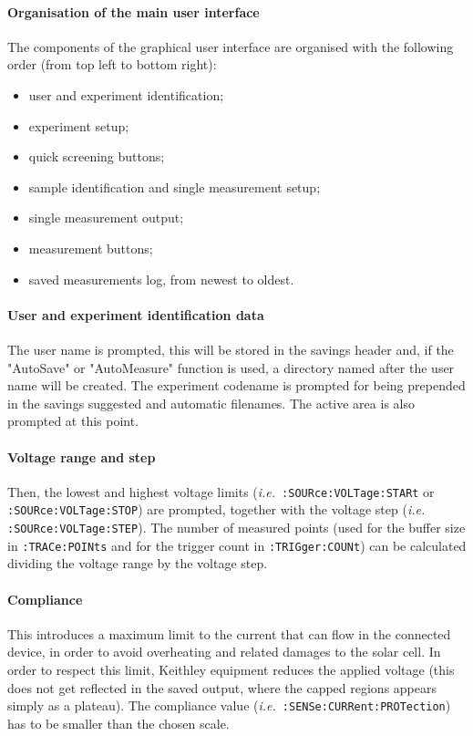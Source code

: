 		\paragraph{Organisation of the main user interface}
		The components of the graphical user interface are organised with the following order (from top left to bottom right):
		\begin{itemize}
			\item user and experiment identification;
			\item experiment setup;
			\item quick screening buttons;
			\item sample identification and single measurement setup;
			\item single measurement output;
			\item measurement buttons;
			\item saved measurements log, from newest to oldest.
		\end{itemize}


		\paragraph{User and experiment identification data}
		The user name is prompted, this will be stored in the savings header and, if the "AutoSave" or "AutoMeasure" function is used, a directory named after the user name will be created.
		The experiment codename is prompted for being prepended in the savings suggested and automatic filenames.
		The active area is also prompted at this point.

		\paragraph{Voltage range and step}
		Then, the lowest and highest voltage limits (\textsl{i.e.}\ \texttt{:SOURce:\-VOLTage:\-STARt} or \texttt{:SOURce:\-VOLTage:\-STOP}) are prompted, together with the voltage step (\textsl{i.e.} \texttt{:SOURce:\-VOLTage:\-STEP}).
		The number of measured points (used for the buffer size in \texttt{:TRACe:\-POINts} and for the trigger count in \texttt{:TRIGger:\-COUNt}) can be calculated dividing the voltage range by the voltage step.

		\paragraph{Compliance}
		This introduces a maximum limit to the current that can flow in the connected device, in order to avoid overheating and related damages to the solar cell.
		In order to respect this limit, Keithley equipment reduces the applied voltage (this does not get reflected in the saved output, where the capped regions appears simply as a plateau).
		The compliance value (\textsl{i.e.}\ \texttt{:SENSe:\-CURRent:\-PROTection}) has to be smaller than the chosen scale.

